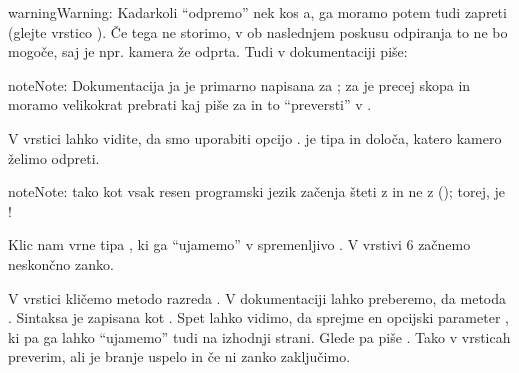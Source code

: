 \documentclass[letterpaper,10pt,english]{sphinxmanual}
\begin{document}
\begin{sphinxadmonition}{warning}{Warning:}
\sphinxAtStartPar
Kadarkoli “odpremo” nek kos \sphinxhyphen{}a, ga moramo potem tudi zapreti (glejte vrstico ). Če tega ne storimo, v ob naslednjem poskusu odpiranja to ne bo mogoče, saj je npr. kamera že odprta. Tudi v dokumentaciji piše: 
\end{sphinxadmonition}

\begin{sphinxadmonition}{note}{Note:}
\sphinxAtStartPar
Dokumentacija \sphinxhyphen{}ja je primarno napisana za ; za  je precej skopa in moramo velikokrat prebrati kaj piše za  in to “preversti” v .
\end{sphinxadmonition}

\sphinxAtStartPar
V vrstici  lahko vidite, da smo uporabiti opcijo .  je tipa  in določa, katero kamero želimo odpreti.

\begin{sphinxadmonition}{note}{Note:}
\sphinxAtStartPar
{} tako kot vsak resen programski jezik začenja šteti z  in ne z  (); torej,  je !
\end{sphinxadmonition}

\sphinxAtStartPar
Klic nam vrne  tipa , ki ga “ujamemo” v spremenljivo . V vrstivi 6 začnemo neskončno  zanko.

\begin{sphinxVerbatim}[commandchars=\\\{\}]
       
\end{sphinxVerbatim}

\sphinxAtStartPar
V vrstici  kličemo metodo razreda  . V dokumentaciji lahko preberemo, da metoda . Sintaksa je zapisana kot . Spet lahko vidimo, da sprejme en opcijski parameter , ki pa ga lahko “ujamemo” tudi na izhodnji strani. Glede  pa piše . Tako v vrsticah  preverim, ali je branje uspelo in če ni  zanko zaključimo.
\end{document}
